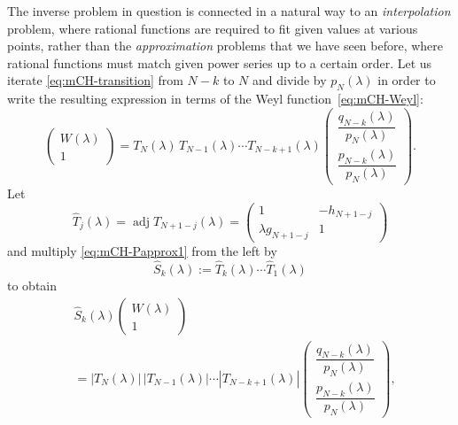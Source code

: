 \documentclass[10pt,a4paper]{article} \pdfoutput=1 
\begin{document}
The inverse problem in question is connected in a natural way to an \emph{interpolation} problem,
where rational functions are required to fit given values at various points,
rather than the \emph{approximation} problems that we have seen before,
where rational functions must match given power series up to a certain order.
Let us iterate \eqref{eq:mCH-transition} from $N-k$ to $N$ and divide by $p_N(\lambda)$
in order to write the resulting expression in terms
of the Weyl function~\eqref{eq:mCH-Weyl}:
\begin{equation}
  \label{eq:mCH-Papprox1}
  \begin{pmatrix} W(\lambda) \\ 1 \end{pmatrix}
  = T_N(\lambda) \, T_{N-1}(\lambda) \dotsm T_{N-k+1}(\lambda)
  \begin{pmatrix} \dfrac{q_{N-k}(\lambda)}{p_{N}(\lambda)} \\[1em] \dfrac{p_{N-k}(\lambda)}{p_{N}(\lambda)} \end{pmatrix}
  .
\end{equation}
Let
\begin{equation}
  \label{eq:mCH-matrix-C}
  \widehat T_{j}(\lambda)
  = \operatorname{adj} T_{N+1-j}(\lambda)
  = \begin{pmatrix} 1 & -h_{N+1-j} \\ \lambda g_{N+1-j} & 1 \end{pmatrix}
\end{equation}
and multiply \eqref{eq:mCH-Papprox1} from the left by
\begin{equation}
  \label{eq:mCH-matrix-Shat}
  \widehat S_k(\lambda) := \widehat T_{k}(\lambda) \dotsm \widehat T_1(\lambda)
\end{equation}
to obtain
\begin{equation*}
  \begin{split}
    & \widehat S_k(\lambda)
    \begin{pmatrix} W(\lambda) \\ 1 \end{pmatrix}
    \\ &
    = |T_N(\lambda)| \, |T_{N-1}(\lambda)| \dotsm |T_{N-k+1}(\lambda)|
    \begin{pmatrix} \dfrac{q_{N-k}(\lambda)}{p_{N}(\lambda)} \\[1em] \dfrac{p_{N-k}(\lambda)}{p_{N}(\lambda)} \end{pmatrix}
    ,
  \end{split}
\end{equation*}
\end{document}
